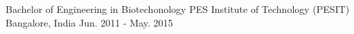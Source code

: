 

\begin{cventries}

  \cventry
    {Bachelor of Engineering in Biotechonology} %
    {PES Institute of Technology (PESIT)} %
    {Bangalore, India} %
    {Jun. 2011 - May. 2015} %
    {
    }

\end{cventries}
